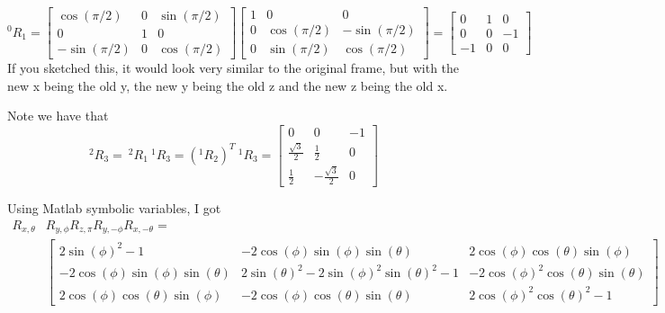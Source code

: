 \documentclass{../homework}
\begin{document}
\begin{solution}
  \[
  ^0R_1 =
  \begin{bmatrix}
  \cos(\pi/2)  & 0 & \sin(\pi/2) \\
  0 			  & 1 &    0     \\
  -\sin(\pi/2) & 0 & \cos(\pi/2)
  \end{bmatrix}
  \begin{bmatrix}
  1 &     0    &    0      \\
  0 & \cos(\pi/2) & -\sin(\pi/2) \\
  0 & \sin(\pi/2) & \cos(\pi/2)
  \end{bmatrix}
  =
  \begin{bmatrix}
    0 & 1 & 0 \\
    0 & 0 & -1 \\
    -1 & 0 & 0
  \end{bmatrix}
  \]
If you sketched this, it would look very similar to the original frame, but with the new x being the old y, the new y being the old z and the new z being the old x.
\end{solution}

\begin{problem}
\end{problem}

\begin{solution}
 Note we have that 
 \[^2R_3 =\ ^2R_1\ ^1R_3 = (^1R_2)^T\ ^1R_3 = 
 \begin{bmatrix}
  0 & 0 & -1 \\
  \frac{\sqrt{3}}{2} & \frac{1}{2} & 0\\
  \frac{1}{2} & -\frac{\sqrt{3}}{2} & 0
 \end{bmatrix}
 \]
\end{solution}

\begin{problem}
\end{problem}

\begin{solution}
 Using Matlab symbolic variables, I got
 \[ 
   \begin{aligned}
     R_{x,\theta}&R_{y,\phi}R_{z,\pi}R_{y,-\phi}R_{x,-\theta} = \\
                                                            &\begin{bmatrix}
     2\sin(\phi)^2 -1 & -2\cos(\phi)\sin(\phi)\sin(\theta) & 2\cos(\phi)\cos(\theta)\sin(\phi) \\
     -2\cos(\phi)\sin(\phi)\sin(\theta) & 2\sin(\theta)^2 - 2\sin(\phi)^2\sin(\theta)^2 -1 & -2\cos(\phi)^2\cos(\theta)\sin(\theta) \\
     2\cos(\phi)\cos(\theta)\sin(\phi) & -2\cos(\phi)\cos(\theta)\sin(\theta) & 2\cos(\phi)^2\cos(\theta)^2 -1
   \end{bmatrix}
 \end{aligned}
 \]
\end{solution}
\end{document}
